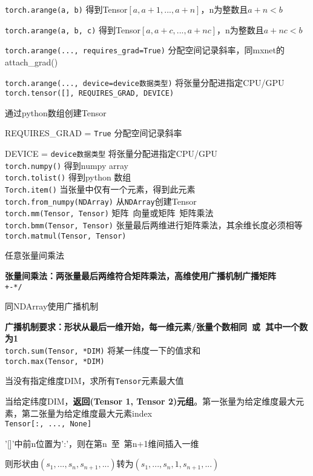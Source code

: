 \documentclass[UTF8]{ctexart}
\begin{document}
  \texttt{torch.arange(a, b)} 得到Tensor$[a, a+1, ..., a+n]$，n为整数且$a+n < b$

  \texttt{torch.arange(a, b, c)} 得到Tensor$[a, a+c, ..., a+nc]$，n为整数且$a+nc < b$
  
  \texttt{torch.arange(..., requires\_grad=True)} 分配空间记录斜率，同mxnet的attach\_grad()
  
  \texttt{torch.arange(..., device=device数据类型)} 将张量分配进指定CPU/GPU\\
\texttt{torch.tensor([], REQUIRES\_GRAD, DEVICE)}
  
  通过python数组创建Tensor

  REQUIRES\_GRAD = \texttt{True} 分配空间记录斜率
  
  DEVICE = \texttt{device数据类型} 将张量分配进指定CPU/GPU\\
\texttt{torch.numpy()} 得到numpy array \\
\texttt{torch.tolist()} 得到python 数组 \\
\texttt{Torch.item()} 当张量中仅有一个元素，得到此元素 \\
\texttt{torch.from\_numpy(NDArray)} 从\texttt{NDArray}创建Tensor\\
\texttt{torch.mm(Tensor, Tensor)} 矩阵\ 向量或矩阵\ 矩阵乘法\\
\texttt{torch.bmm(Tensor, Tensor)} 张量最后两维进行矩阵乘法，其余维长度必须相等\\
\texttt{torch.matmul(Tensor, Tensor)} 

  任意张量间乘法
  
  \textbf{张量间乘法：两张量最后两维符合矩阵乘法，高维使用广播机制广播矩阵}\\
\texttt{+-*/} 

  同NDArray使用广播机制
  
  \textbf{广播机制要求：形状从最后一维开始，每一维元素/张量个数相同\ 或\ 其中一个数为1}\\
\texttt{torch.sum(Tensor, *DIM)} 将某一纬度一下的值求和\\
\texttt{torch.max(Tensor, *DIM)} 

  当没有指定维度DIM，求所有\texttt{Tensor}元素最大值
  
  当给定纬度DIM，\textbf{返回(Tensor 1, Tensor 2)元组}。第一张量为给定维度最大元素，第二张量为给定维度最大元素index\\
\texttt{Tensor[:, ..., None]} 
  
  '[]'中前n位置为':'，则在第n\ 至\ 第n+1维间插入一维

  则形状由$(s_1, ..., s_n, s_{n+1}, ...)$转为$(s_1, ..., s_n, 1, s_{n+1}, ...)$
  
\end{document}
